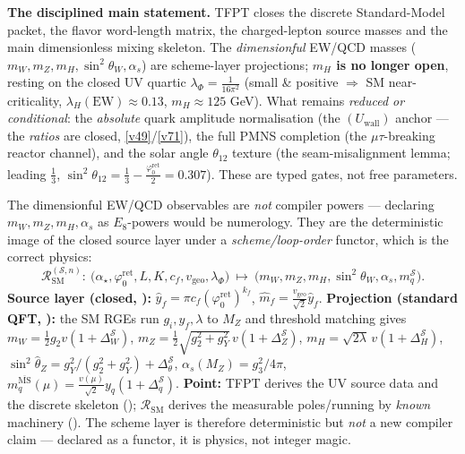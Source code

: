 \documentclass[11pt,a4paper]{article}
\newcommand{\phiz}{\varphi_0^{\mathrm{ret}}}
\newcommand{\vgeo}{v_{\mathrm{geo}}}
\theoremstyle{definition}
\begin{document}
\par\smallskip\noindent\textbf{The disciplined main statement.}
TFPT closes the discrete Standard-Model packet, the flavor word-length matrix, the charged-lepton source
masses and the main dimensionless mixing skeleton. The \emph{dimensionful} EW/QCD masses
($m_W,m_Z,m_H,\sin^2\theta_W,\alpha_s$) are scheme-layer projections; \textbf{$m_H$ is no longer open},
resting on the closed UV quartic $\lambda_\Phi{=}\tfrac1{16\pi^2}$ (small \& positive $\Rightarrow$ SM
near-criticality, $\lambda_H(\mathrm{EW})\!\approx\!0.13$, $m_H\!\approx\!125$ GeV). What remains
\emph{reduced or conditional}: the \emph{absolute} quark amplitude normalisation (the $(U_{\mathrm{wall}})$
anchor --- the \emph{ratios} are closed, \vref{v49}/\vref{v71}), the
full PMNS completion (the $\mu\tau$-breaking reactor channel), and the solar angle $\theta_{12}$ texture
(the seam-misalignment lemma; leading $\tfrac13$, $\sin^2\theta_{12}=\tfrac13-\tfrac{\phiz}2=0.307$). These
are typed gates, not free parameters.

\begin{keybox}
The dimensionful EW/QCD observables are \emph{not} compiler powers --- declaring $m_W,m_Z,m_H,\alpha_s$ as
$E_8$-powers would be numerology. They are the deterministic image of the closed source layer under a
\emph{scheme/loop-order} functor, which is the correct physics:
\[
  \mathcal R_{\mathrm{SM}}^{(\mathcal S,n)}:\ 
  \bigl(\alpha_\star,\phiz,L,K,c_f,v_{\mathrm{geo}},\lambda_\Phi\bigr)\ \longmapsto\
  \bigl(m_W,m_Z,m_H,\sin^2\theta_W,\alpha_s,m_q^{\mathcal S}\bigr).
\]
\textbf{Source layer (closed, \mE):} $\hat y_f=\pi c_f(\phiz)^{k_f}$, $\hat m_f=\tfrac{\vgeo}{\sqrt2}\hat y_f$.
\textbf{Projection (standard QFT, \mC):} the SM RGEs run $g_i,y_f,\lambda$ to $M_Z$ and threshold matching
gives $m_W=\tfrac12 g_2 v(1{+}\Delta_W^{\mathcal S})$, $m_Z=\tfrac12\sqrt{g_2^2{+}g_Y^2}\,v(1{+}\Delta_Z^{\mathcal S})$,
$m_H=\sqrt{2\lambda}\,v(1{+}\Delta_H^{\mathcal S})$, $\sin^2\hat\theta_Z=g_Y^2/(g_2^2{+}g_Y^2)+\Delta_\theta^{\mathcal S}$,
$\alpha_s(M_Z)=g_3^2/4\pi$, $m_q^{\overline{\mathrm{MS}}}(\mu)=\tfrac{v(\mu)}{\sqrt2}y_q(1{+}\Delta_q^{\mathcal S})$.
\textbf{Point:} TFPT derives the UV source data and the discrete skeleton (\mE); $\mathcal R_{\mathrm{SM}}$
derives the measurable poles/running by \emph{known} machinery (\mC). The scheme layer is therefore
deterministic but \emph{not} a new compiler claim --- declared as a functor, it is physics, not integer magic.
\end{keybox}
\end{document}

